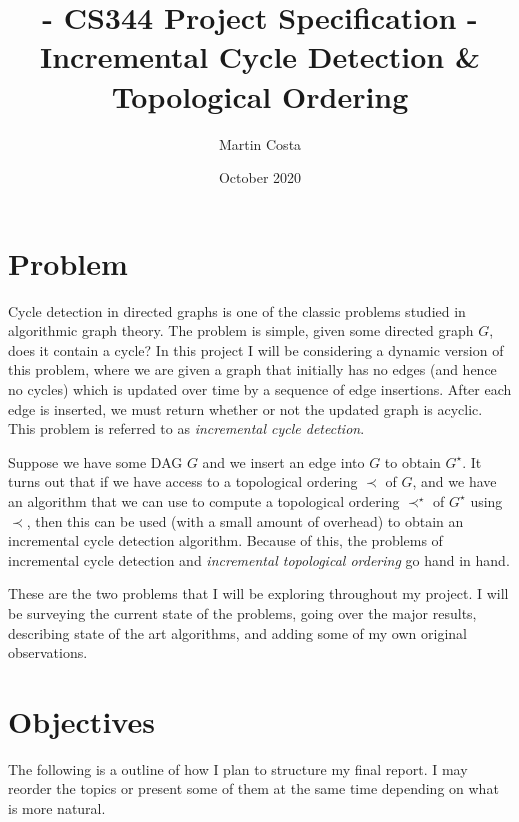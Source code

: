 \documentclass{article}
\title{- CS344 Project Specification - \\  Incremental Cycle Detection \& Topological Ordering }
\author{Martin Costa}
\date{October 2020}
\begin{document}
\maketitle

\section{Problem}

Cycle detection in directed graphs is one of the classic problems studied in algorithmic graph theory. The problem is simple, given some directed graph $G$, does it contain a cycle? In this project I will be considering a dynamic version of this problem, where we are given a graph that initially has no edges (and hence no cycles) which is updated over time by a sequence of edge insertions. After each edge is inserted, we must return whether or not the updated graph is acyclic. This problem is referred to as \textit{incremental cycle detection}.

Suppose we have some DAG $G$ and we insert an edge into $G$ to obtain $G^{\star}$. It turns out that if we have access to a topological ordering $\prec$ of $G$, and we have an algorithm that we can use to compute a topological ordering $\prec^{\star}$ of $G^{\star}$ using $\prec$, then this can be used (with a small amount of overhead) to obtain an incremental cycle detection algorithm. Because of this, the problems of incremental cycle detection and \textit{incremental topological ordering} go hand in hand.

These are the two problems that I will be exploring throughout my project. I will be surveying the current state of the problems, going over the major results, describing state of the art algorithms, and adding some of my own original observations.

\section{Objectives}

The following is a outline of how I plan to structure my final report. I may reorder the topics or present some of them at the same time depending on what is more natural.
\end{document}
